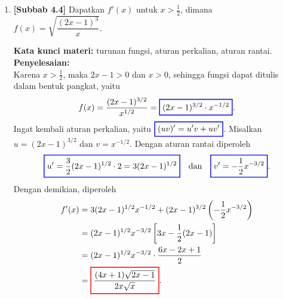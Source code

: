 \documentclass[10pt,openany,a4paper]{article}
\theoremstyle{definition}
\theoremstyle{definition}
\theoremstyle{plain}
\newenvironment{jawab}[2][tes]{%
\par\noindent\textbf{Kata kunci materi:} #1.\\
\textbf{Penyelesaian:} #2%
}{}
\begin{document}
\begin{enumerate}
    \item \textbf{[Subbab 4.4]} Dapatkan $f'(x)$ untuk $x>\frac{1}{2}$, dimana $f(x)=\sqrt{\dfrac{(2x-1)^3}{x}}$.
    \begin{jawab}[turunan fungsi, aturan perkalian, aturan rantai]{~\\
        Karena $x>\frac{1}{2}$, maka $2x-1>0$ dan $x>0$, sehingga fungsi dapat ditulis dalam bentuk pangkat, yaitu
        \begin{align*}
            f(x) = \frac{(2x-1)^{3/2}}{x^{1/2}} = \colorlet{oldcolor}{.}
        \color{blue}
        \setlength{\fboxrule}{1pt} \boxed{\color{oldcolor}(2x-1)^{3/2}\cdot x^{-1/2}}\color{oldcolor}.
        \end{align*}
        Ingat kembali aturan perkalian, yaitu $\colorlet{oldcolor}{.}
        \color{blue}
        \setlength{\fboxrule}{1pt} \boxed{\color{oldcolor}(uv)'=u'v+uv'}\color{oldcolor}$. Misalkan $u=(2x-1)^{3/2}$ dan $v=x^{-1/2}$. Dengan aturan rantai diperoleh
        \begin{align*}
            \colorlet{oldcolor}{.}
        \color{blue}
        \setlength{\fboxrule}{1pt} \boxed{\color{oldcolor}u' = \frac{3}{2}(2x-1)^{1/2}\cdot 2 = 3(2x-1)^{1/2}}\color{oldcolor} \quad\text{dan}\quad \colorlet{oldcolor}{.}
        \color{blue}
        \setlength{\fboxrule}{1pt} \boxed{\color{oldcolor}v' = -\frac{1}{2}x^{-3/2}}\color{oldcolor}.
        \end{align*}
        Dengan demikian, diperoleh
        \begin{align*}
            f'(x) &= 3(2x-1)^{1/2}x^{-1/2} + (2x-1)^{3/2}\left(-\frac{1}{2}x^{-3/2}\right)\\
            &= (2x-1)^{1/2}x^{-3/2}\left[3x - \frac{1}{2}(2x-1)\right]\\
            &= (2x-1)^{1/2}x^{-3/2}\cdot\frac{6x-2x+1}{2}\\
            &= \colorlet{oldcolor}{.}
        \color{red}
        \setlength{\fboxrule}{1pt} \boxed{\color{oldcolor}\frac{(4x+1)\sqrt{2x-1}}{2x\sqrt{x}}}\color{oldcolor}.
        \end{align*}
    }
    \end{jawab}
\end{enumerate}

\newpage
\end{document}
